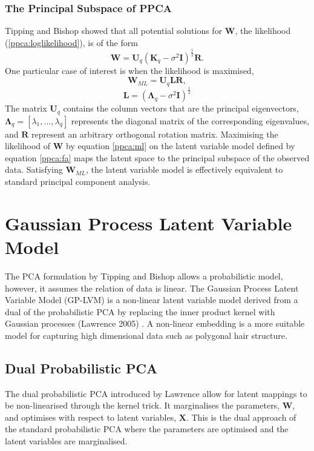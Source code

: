 \documentclass[ %
author={Dillon Keith Diep},
supervisor={Dr. Carl Henrik Ek},
degree={MEng},
title={ART-CG Hair:},
subtitle={Assisted Real-time Content Generation of Stylised Virtual Hair},
type={Research},
year={2017} ]{dissertation}
\begin{document}
\subsubsection{The Principal Subspace of PPCA}
Tipping and Bishop showed that all potential solutions for $\bm{W}$, the likelihood (\ref{ppca:loglikelihood}), is of the form \cite{ppca} $$\bm{W}=\bm{U}_q(\bm{K}_q-\sigma^2\bm{I})^\frac{1}{2}\bm{R}.$$
One particular case of interest is when the likelihood is maximised,
\begin{equation} \label{ppca:ml}
\bm{W}_{ML}=\bm{U}_q\bm{LR},
\end{equation}
$$\bm{L}=(\bm{\Lambda}_q-\sigma^2\bm{I})^{\frac{1}{2}}$$
The matrix $\bm{U}_q$ contains the column vectors that are the principal eigenvectors, $\bm{\Lambda}_q=[\lambda_1,...,\lambda_q]$ represents the diagonal matrix of the corresponding eigenvalues, and $\bm{R}$ represent an arbitrary orthogonal rotation matrix. 
Maximising the likelihood of $\bm{W}$ by equation \ref{ppca:ml} on the latent variable model defined by equation \ref{ppca:fa} maps the latent space to the principal subspace of the observed data. Satisfying $\bm{W}_{ML}$, the latent variable model is effectively equivalent to standard principal component analysis.

\section{Gaussian Process Latent Variable Model}
The PCA formulation by Tipping and Bishop allows a probabilistic model, however, it assumes the relation of data is linear. The Gaussian Process Latent Variable Model (GP-LVM) is a non-linear latent variable model derived from a dual of the probabilistic PCA by replacing the inner product kernel with Gaussian processes (Lawrence 2005) \cite{gplvm}. A non-linear embedding is a more suitable model for capturing high dimensional data such as polygonal hair structure.
	
\subsection{Dual Probabilistic PCA}
The dual probabilistic PCA introduced by Lawrence allow for latent mappings to be non-linearised through the kernel trick. It marginalises the parameters, $\bm{W}$, and optimises with respect to latent variables, $\bm{X}$. This is the dual approach of the standard probabilistic PCA where the parameters are optimised and the latent variables are marginalised.
\end{document}
